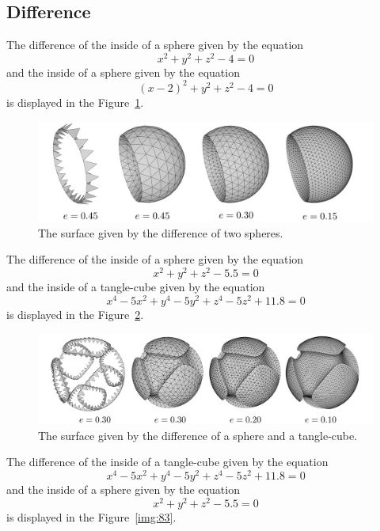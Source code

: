 \subsection{Difference}

The difference of the inside of a sphere given by the equation
$$x^2+y^2+z^2-4=0$$ and the inside of a sphere given by the 
equation $$(x-2)^2+y^2+z^2-4=0$$ is displayed in the Figure~\ref{img:80}.

\begin{figure}[h!]
    \centerline{\includegraphics[scale=0.49]{images/img80}}
    \caption[The surface given by the difference of two spheres]
    {The surface given by the difference of two spheres.}
    \label{img:80}
\end{figure}

The difference of the inside of a sphere given by the equation
$$x^2+y^2+z^2-5.5=0$$ and the inside of a tangle-cube given by the 
equation $$x^4-5x^2+y^4-5y^2+z^4-5z^2+11.8=0$$ is displayed in the Figure~\ref{img:82}.

\begin{figure}[h!]
    \centerline{\includegraphics[scale=0.49]{images/img82}}
    \caption[The surface given by the difference of a sphere and a tangle-cube]
    {The surface given by the difference of a sphere and a tangle-cube.}
    \label{img:82}
\end{figure}

The difference of the inside of a tangle-cube given by the 
equation $$x^4-5x^2+y^4-5y^2+z^4-5z^2+11.8=0$$ and the inside 
of a sphere given by the equation
$$x^2+y^2+z^2-5.5=0$$ is displayed in the Figure~\ref{img:83}.

